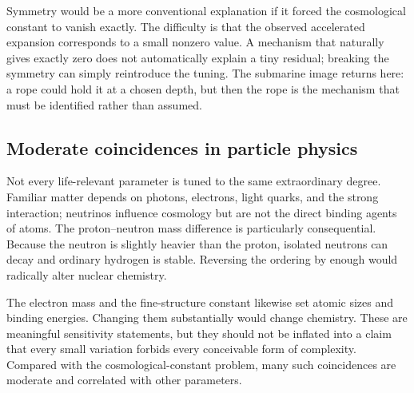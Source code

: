 Symmetry would be a more conventional explanation if it forced the cosmological constant to vanish exactly. The difficulty is that the observed accelerated expansion corresponds to a small nonzero value. A mechanism that naturally gives exactly zero does not automatically explain a tiny residual; breaking the symmetry can simply reintroduce the tuning. The submarine image returns here: a rope could hold it at a chosen depth, but then the rope is the mechanism that must be identified rather than assumed.

\begin{classroomqa}
\end{classroomqa}

\begin{classroomqa}
\end{classroomqa}

\subsection{Moderate coincidences in particle physics}

Not every life-relevant parameter is tuned to the same extraordinary degree. Familiar matter depends on photons, electrons, light quarks, and the strong interaction; neutrinos influence cosmology but are not the direct binding agents of atoms. The proton--neutron mass difference is particularly consequential. Because the neutron is slightly heavier than the proton, isolated neutrons can decay and ordinary hydrogen is stable. Reversing the ordering by enough would radically alter nuclear chemistry.

The electron mass and the fine-structure constant likewise set atomic sizes and binding energies. Changing them substantially would change chemistry. These are meaningful sensitivity statements, but they should not be inflated into a claim that every small variation forbids every conceivable form of complexity. Compared with the cosmological-constant problem, many such coincidences are moderate and correlated with other parameters.

